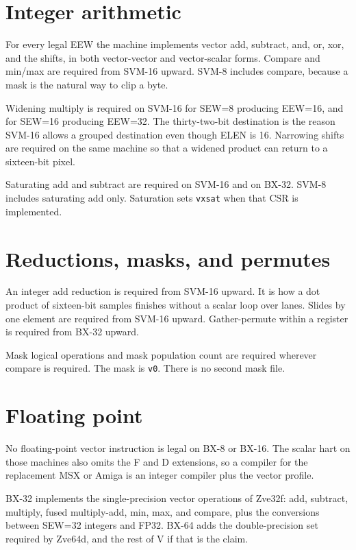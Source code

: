 \section{Integer arithmetic}

For every legal EEW the machine implements vector add, subtract, and, or, xor, and the shifts, in both vector-vector and vector-scalar forms. Compare and min/max are required from SVM-16 upward. SVM-8 includes compare, because a mask is the natural way to clip a byte.

Widening multiply is required on SVM-16 for SEW=8 producing EEW=16, and for SEW=16 producing EEW=32. The thirty-two-bit destination is the reason SVM-16 allows a grouped destination even though ELEN is 16. Narrowing shifts are required on the same machine so that a widened product can return to a sixteen-bit pixel.

Saturating add and subtract are required on SVM-16 and on BX-32. SVM-8 includes saturating add only. Saturation sets \texttt{vxsat} when that CSR is implemented.

\section{Reductions, masks, and permutes}

An integer add reduction is required from SVM-16 upward. It is how a dot product of sixteen-bit samples finishes without a scalar loop over lanes. Slides by one element are required from SVM-16 upward. Gather-permute within a register is required from BX-32 upward.

Mask logical operations and mask population count are required wherever compare is required. The mask is \texttt{v0}. There is no second mask file.

\section{Floating point}

No floating-point vector instruction is legal on BX-8 or BX-16. The scalar hart on those machines also omits the F and D extensions, so a compiler for the replacement MSX or Amiga is an integer compiler plus the vector profile.

BX-32 implements the single-precision vector operations of Zve32f: add, subtract, multiply, fused multiply-add, min, max, and compare, plus the conversions between SEW=32 integers and FP32. BX-64 adds the double-precision set required by Zve64d, and the rest of V if that is the claim.

